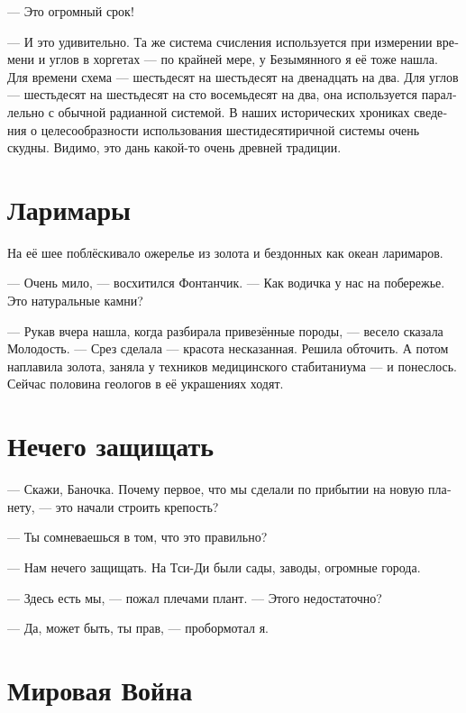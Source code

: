 \documentclass[a4paper,12pt,fleqn]{book}\usepackage{polyglossia}\setdefaultlanguage[babelshorthands=true]{russian}\setotherlanguage{english}\defaultfontfeatures{Ligatures=TeX,Mapping=tex-text}\usepackage{xcolor}\newcommand{\ml}[3]{#2}
\begin{document}
{--- Это огромный срок!

--- И это удивительно.
Та же система счисления используется при измерении времени и углов в хоргетах --- по крайней мере, у Безымянного я её тоже нашла.
Для времени схема --- шестьдесят на шестьдесят на двенадцать на два.
Для углов --- шестьдесят на шестьдесят на сто восемьдесят на два, она используется параллельно с обычной радианной системой.
В наших исторических хрониках сведения о целесообразности использования шестидесятиричной системы очень скудны.
Видимо, это дань какой-то очень древней традиции.

\section{Ларимары}

На её шее поблёскивало ожерелье из золота и бездонных как океан ларимаров.

--- Очень мило, --- восхитился Фонтанчик.
--- Как водичка у нас на побережье.
Это натуральные камни?

--- Рукав вчера нашла, когда разбирала привезённые породы, --- весело сказала Молодость.
--- Срез сделала --- красота несказанная.
Решила обточить.
А потом наплавила золота, заняла у техников медицинского стабитаниума --- и понеслось.
Сейчас половина геологов в её украшениях ходят.

\section{Нечего защищать}

--- Скажи, Баночка.
Почему первое, что мы сделали по прибытии на новую планету, --- это начали строить крепость?

--- Ты сомневаешься в том, что это правильно?

--- Нам нечего защищать.
На Тси-Ди были сады, заводы, огромные города.

--- Здесь есть мы, --- пожал плечами плант.
--- Этого недостаточно?

--- Да, может быть, ты прав, --- пробормотал я.

\section{Мировая Война}

}
\end{document}
